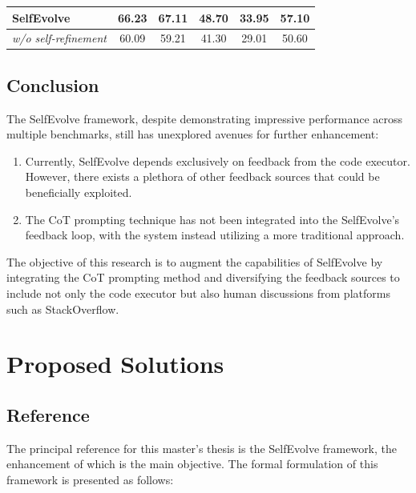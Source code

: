 \documentclass[a4paper,oneside]{book}
\begin{document}
\begin{table}[H]
\begin{center}
\begin{tabular}{|lccccc|}
      \multicolumn{1}{|l|}{SelfEvolve}                       & \multicolumn{1}{c|}{\textbf{66.23}}        & \multicolumn{1}{c|}{\textbf{67.11}} & \multicolumn{1}{c|}{\textbf{48.70}} & \multicolumn{1}{c|}{\textbf{33.95}} & \textbf{57.10} \\ \hline
      \multicolumn{1}{|r|}{\textit{w/o self-refinement}}     & \multicolumn{1}{c|}{60.09}                 & \multicolumn{1}{c|}{59.21}          & \multicolumn{1}{c|}{41.30}          & \multicolumn{1}{c|}{29.01}          & 50.60          \\ \hline
    \end{tabular}
  \end{center}
\end{table}

\section{Conclusion}
The SelfEvolve framework, despite demonstrating impressive performance across multiple benchmarks, still has unexplored avenues for further enhancement:

\begin{enumerate}
  \item Currently, SelfEvolve depends exclusively on feedback from the code executor. However, there exists a plethora of other feedback sources that could be beneficially exploited.

  \item The CoT prompting technique has not been integrated into the SelfEvolve's feedback loop, with the system instead utilizing a more traditional approach.
\end{enumerate}

The objective of this research is to augment the capabilities of SelfEvolve by integrating the CoT prompting method and diversifying the feedback sources to include not only the code executor but also human discussions from platforms such as StackOverflow.

\chapter{Proposed Solutions}
\section{Reference}
The principal reference for this master's thesis is the SelfEvolve framework, the enhancement of which is the main objective. The formal formulation of this framework is presented as follows:
\end{document}
